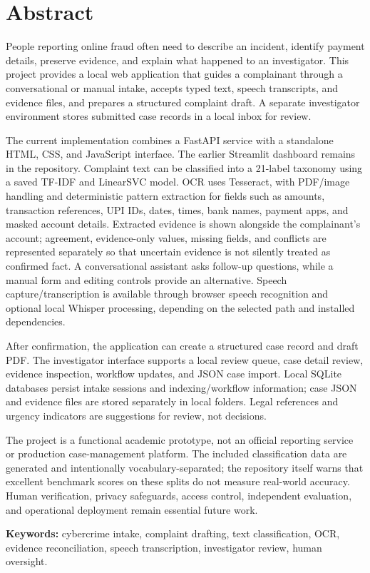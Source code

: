 \documentclass[12pt,a4paper,oneside]{report}
\begin{document}
\clearpage{}\pagestyle{front}


\clearpage\chapter*{Abstract}

People reporting online fraud often need to describe an incident, identify payment details, preserve evidence, and explain what happened to an investigator. This project provides a local web application that guides a complainant through a conversational or manual intake, accepts typed text, speech transcripts, and evidence files, and prepares a structured complaint draft. A separate investigator environment stores submitted case records in a local inbox for review.\par\medskip
The current implementation combines a FastAPI service with a standalone HTML, CSS, and JavaScript interface. The earlier Streamlit dashboard remains in the repository. Complaint text can be classified into a 21-label taxonomy using a saved TF-IDF and LinearSVC model. OCR uses Tesseract, with PDF/image handling and deterministic pattern extraction for fields such as amounts, transaction references, UPI IDs, dates, times, bank names, payment apps, and masked account details. Extracted evidence is shown alongside the complainant's account; agreement, evidence-only values, missing fields, and conflicts are represented separately so that uncertain evidence is not silently treated as confirmed fact. A conversational assistant asks follow-up questions, while a manual form and editing controls provide an alternative. Speech capture/transcription is available through browser speech recognition and optional local Whisper processing, depending on the selected path and installed dependencies.\par\medskip
After confirmation, the application can create a structured case record and draft PDF. The investigator interface supports a local review queue, case detail review, evidence inspection, workflow updates, and JSON case import. Local SQLite databases persist intake sessions and indexing/workflow information; case JSON and evidence files are stored separately in local folders. Legal references and urgency indicators are suggestions for review, not decisions.\par\medskip
The project is a functional academic prototype, not an official reporting service or production case-management platform. The included classification data are generated and intentionally vocabulary-separated; the repository itself warns that excellent benchmark scores on these splits do not measure real-world accuracy. Human verification, privacy safeguards, access control, independent evaluation, and operational deployment remain essential future work.\par\medskip
\textbf{Keywords:} cybercrime intake, complaint drafting, text classification, OCR, evidence reconciliation, speech transcription, investigator review, human oversight.\par\medskip
\end{document}
